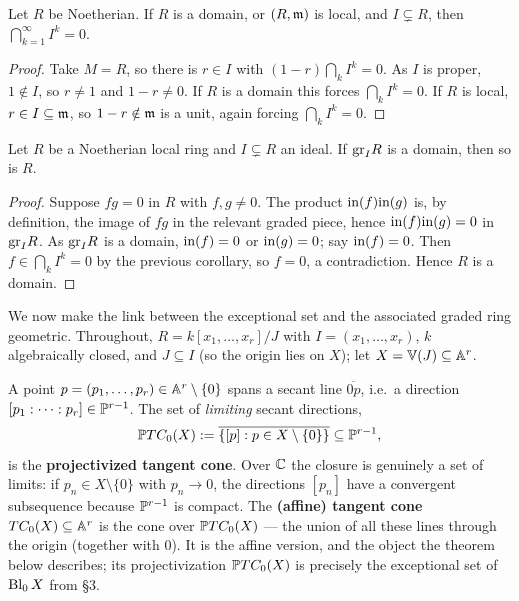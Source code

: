 \documentclass[11pt]{article}
\begin{document}
\begin{corollary}
    Let $R$ be Noetherian. If $R$ is a domain, or $(R, \fm)$ is local, and $I \subsetneq R$, then $\bigcap_{k=1}^\infty I^k = 0$.
\end{corollary}

\begin{proof}
    Take $M = R$, so there is $r \in I$ with $(1-r)\bigcap_k I^k = 0$. As $I$ is proper, $1 \notin I$, so $r \neq 1$ and $1 - r \neq 0$. If $R$ is a domain this forces $\bigcap_k I^k = 0$. If $R$ is local, $r \in I \subseteq \fm$, so $1 - r \notin \fm$ is a unit, again forcing $\bigcap_k I^k = 0$.
\end{proof}

\begin{corollary}
    Let $R$ be a Noetherian local ring and $I \subsetneq R$ an ideal. If $\gr_I R$ is a domain, then so is $R$.
\end{corollary}

\begin{proof}
    Suppose $fg = 0$ in $R$ with $f, g \neq 0$. The product $\init(f)\init(g)$ is, by definition, the image of $fg$ in the relevant graded piece, hence $\init(f)\init(g) = 0$ in $\gr_I R$. As $\gr_I R$ is a domain, $\init(f) = 0$ or $\init(g) = 0$; say $\init(f) = 0$. Then $f \in \bigcap_{k} I^k = 0$ by the previous corollary, so $f = 0$, a contradiction. Hence $R$ is a domain.
\end{proof}

We now make the link between the exceptional set and the associated graded ring geometric. Throughout, $R = k[x_1, \ldots, x_r]/J$ with $I = (x_1, \ldots, x_r)$, $k$ algebraically closed, and $J \subseteq I$ (so the origin lies on $X$); let $X = \V(J) \subseteq \A^r$.

\begin{definition}
    A point $p = (p_1,\ldots,p_r) \in \A^r \setminus \{0\}$ spans a secant line $\overline{0p}$, i.e.\ a direction $[p_1 : \cdots : p_r] \in \P^{r-1}$. The set of \emph{limiting} secant directions,
    \[\P TC_0(X) := \overline{\{[p] : p \in X \setminus \{0\}\}} \subseteq \P^{r-1},\]
    is the \textbf{projectivized tangent cone}. Over $\C$ the closure is genuinely a set of limits: if $p_n \in X\setminus\{0\}$ with $p_n \to 0$, the directions $[p_n]$ have a convergent subsequence because $\P^{r-1}$ is compact. The \textbf{(affine) tangent cone} $TC_0(X) \subseteq \A^r$ is the cone over $\P TC_0(X)$ --- the union of all these lines through the origin (together with $0$). It is the affine version, and the object the theorem below describes; its projectivization $\P TC_0(X)$ is precisely the exceptional set of $\Bl_0 X$ from \S3.
\end{definition}
\end{document}
